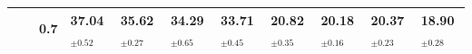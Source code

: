 \begin{table}[t]
\begin{tabular}{ccc|llll|llll}
 &  & 0.7 & 37.04$_{\scriptstyle \pm 0.52}$ & 35.62$_{\scriptstyle \pm 0.27}$ & 34.29$_{\scriptstyle \pm 0.65}$ & \cellcolor{gray!15}\textbf{33.71$_{\scriptstyle \pm 0.45}$} & 20.82$_{\scriptstyle \pm 0.35}$ & 20.18$_{\scriptstyle \pm 0.16}$ & 20.37$_{\scriptstyle \pm 0.23}$ & \cellcolor{gray!15}\textbf{18.90$_{\scriptstyle \pm 0.28}$} \\
\bottomrule
\end{tabular}
\label{tab:ppl}
\vspace{-0.5cm}

\end{table}
